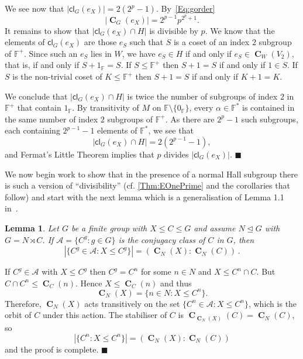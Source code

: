 \documentclass[a4paper,12pt,reqno]{amsart}
\newtheorem{lemma}[theorem]{Lemma}
\numberwithin{equation}{section}
\DeclareMathOperator{\cent}{\mathbf{C}}
\newcommand{\card}[1]{\left\lvert{#1}\right\rvert}
\renewcommand{\leq}{\leqslant}
\newenvironment{proofof}{{\bf {Proof.} }}{\hfill $\blacksquare$ \\}
\def\ff{{\mathbb F}}
\def\cl{{\mathsf{c}\mathsf{l}}}
\begin{document}
\begin{proofof}
We see now that $|\cl_G(e_X)| = 2(2^p-1)$.  
By~\eqref{Eq:gorder}
\[
\card{\cent_G(e_X)} = 2^{p-1} p^{2^p+1}.
\]
It remains to show that $\card{\cl_G(e_X) \cap H}$ is divisible by $p$.  
We know that the elements of $\cl_G(e_X)$ are those $e_S$ 
such that $S$ is a coset of an index $2$ subgroup of $\ff^+$.  
Since such an $e_S$ lies in $W$, 
we have $e_S \in H$ if and only if $e_S \in \cent_W(V_2)$, 
that is, if and only if $S + 1_\ff = S$.  
If $S \leq \ff^+$ then $S + 1 = S$ if and only if $1 \in S$.  
If $S$ is the non-trivial coset of $K \leq \ff^+$ then $S+1=S$ if and only if $K + 1 = K$.

We conclude that $\card{\cl_G(e_X) \cap H}$ 
is twice the number of subgroups of index $2$ in $\ff^+$ that contain $1_\ff$.  
By transitivity of $M$ on $\ff \setminus \{0_\ff\}$, 
every $\alpha \in \ff^\ast$ is contained in the same number of index $2$ subgroups of $\ff^+$.  
As there are $2^p-1$ such subgroups, 
each containing $2^{p-1}-1$ elements of $\ff^\ast$, 
we see that
\[
\card{\cl_G(e_X) \cap H} = 2(2^{p-1}-1),
\]
and Fermat's Little Theorem implies that $p$ divides $\card{\cl_G(e_X)}$. 
\end{proofof}



We now begin work to show that in the presence of a normal Hall subgroup
there is such a version of \enquote{divisibility}  
(cf. \autoref{Thm:EOnePrime} and the corollaries that follow) 
and start with the next lemma which is a generalisation of Lemma 1.1 in~\cite{arithmetical_questions}.

 
\begin{lemma}\label{Lem:CarterSemidirect}
Let $G$ be a finite group with $X \leq C \leq G$ and assume $N \unlhd G$ with $G = N \rtimes  C$. 
If $\mathcal{A} = \{ C^g : g \in G\}$ is the conjugacy class of $C$ in $G$, then 
\[
\card{\{ C^g \in \mathcal{A} : X \leq C^g\}} = (\cent_N(X) : \cent_N(C))\,. 
\]
\end{lemma}

\begin{proofof}
If $C^g \in \mathcal{A}$ with $X \leq C^g$ 
then  $C^g = C^n$ for some $n \in N$ and $X \leq C^n \cap C$. 
But $C \cap C^n \leq \cent_C(n)$.  
Hence  $X \leq \cent_C(n)$ and thus 
\[
\cent_N(X) = \{n \in N : X \leq C^n\}.
\] 
Therefore, $\cent_N(X)$ acts transitively on the set  $\{C^n \in \mathcal{A} : X \leq C^n\}$, 
which is the orbit of $C$ under this action. 
The stabiliser of $C$ is $\cent_{\cent_N(X)}(C) = \cent_N(C)$,
so 
\[
\card{\{C^n : X \leq C^n \}} = (\cent_N(X) : \cent_N(C))
\]
and the proof is complete. 
\end{proofof}
\end{document}
